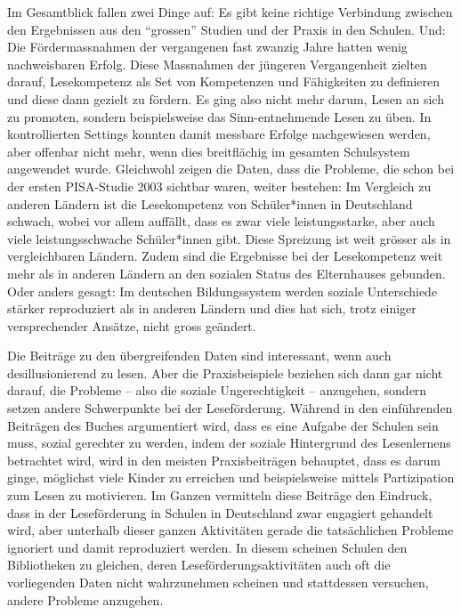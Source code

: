 \documentclass[a4paper,
fontsize=11pt,
oneside,
numbers=noperiodatend,
parskip=half-,
bibliography=totoc,
final
]{scrartcl}
\begin{document}
Im Gesamtblick fallen zwei Dinge auf: Es gibt keine richtige Verbindung
zwischen den Ergebnissen aus den \enquote{grossen} Studien und der
Praxis in den Schulen. Und: Die Fördermassnahmen der vergangenen fast
zwanzig Jahre hatten wenig nachweisbaren Erfolg. Diese Massnahmen der
jüngeren Vergangenheit zielten darauf, Lesekompetenz als Set von
Kompetenzen und Fähigkeiten zu definieren und diese dann gezielt zu
fördern. Es ging also nicht mehr darum, Lesen an sich zu promoten,
sondern beispielsweise das Sinn-entnehmende Lesen zu üben. In
kontrollierten Settings konnten damit messbare Erfolge nachgewiesen
werden, aber offenbar nicht mehr, wenn dies breitflächig im gesamten
Schulsystem angewendet wurde. Gleichwohl zeigen die Daten, dass die
Probleme, die schon bei der ersten PISA-Studie 2003 sichtbar waren,
weiter bestehen: Im Vergleich zu anderen Ländern ist die Lesekompetenz
von Schüler*innen in Deutschland schwach, wobei vor allem auffällt, dass
es zwar viele leistungsstarke, aber auch viele leistungsschwache
Schüler*innen gibt. Diese Spreizung ist weit grösser als in
vergleichbaren Ländern. Zudem sind die Ergebnisse bei der Lesekompetenz
weit mehr als in anderen Ländern an den sozialen Status des Elternhauses
gebunden. Oder anders gesagt: Im deutschen Bildungssystem werden soziale
Unterschiede stärker reproduziert als in anderen Ländern und dies hat
sich, trotz einiger versprechender Ansätze, nicht gross geändert.

Die Beiträge zu den übergreifenden Daten sind interessant, wenn auch
desillusionierend zu lesen. Aber die Praxisbeispiele beziehen sich dann
gar nicht darauf, die Probleme -- also die soziale Ungerechtigkeit --
anzugehen, sondern setzen andere Schwerpunkte bei der Leseförderung.
Während in den einführenden Beiträgen des Buches argumentiert wird, dass
es eine Aufgabe der Schulen sein muss, sozial gerechter zu werden, indem
der soziale Hintergrund des Lesenlernens betrachtet wird, wird in den
meisten Praxisbeiträgen behauptet, dass es darum ginge, möglichst viele
Kinder zu erreichen und beispielsweise mittels Partizipation zum Lesen
zu motivieren. Im Ganzen vermitteln diese Beiträge den Eindruck, dass in
der Leseförderung in Schulen in Deutschland zwar engagiert gehandelt
wird, aber unterhalb dieser ganzen Aktivitäten gerade die tatsächlichen
Probleme ignoriert und damit reproduziert werden. In diesem scheinen
Schulen den Bibliotheken zu gleichen, deren Leseförderungsaktivitäten
auch oft die vorliegenden Daten nicht wahrzunehmen scheinen und
stattdessen versuchen, andere Probleme anzugehen.
\end{document}
